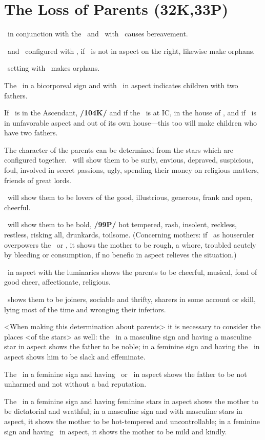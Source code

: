 \section{The Loss of Parents (32K,33P)}

\Mars\, in conjunction with the \Sun\, and \Square\, with \Saturn\, causes bereavement. 

\Saturn\, and \Mars\, configured with \Mercury, if \Jupiter\, is not in aspect on the right, likewise make orphans. 

\Saturn\, setting with \Jupiter\, makes orphans. 

The \Moon\, in a bicorporeal sign and with \Jupiter\, in aspect indicates children with two fathers. 

If \Venus\, is in the Ascendant, \textbf{/104K/} and if the \Moon\, is at IC, in the house of \Mars, and if \Jupiter\, is in unfavorable aspect and out of its own house—this too will make children who have two fathers.

The character of the parents can be determined from the stars which are configured together. \Saturn\, will show them to be surly, envious, depraved, suspicious, foul, involved in secret passions, ugly, spending their money on religious matters, friends of great lords. 

\Jupiter\, will show them to be lovers of the good, illustrious, generous, frank and open, cheerful. 

\Mars\, will show them to be bold, \textbf{/99P/} hot tempered, rash, insolent, reckless, restless, risking all, drunkards, toilsome. (Concerning mothers: if \Mars\,
as houseruler overpowers the \Moon\, or \Venus, it shows the mother to be rough, a whore, troubled acutely by bleeding or consumption, if no benefic in aspect relieves the situation.) 

\Venus\, in aspect with the luminaries shows the parents to be cheerful, musical, fond of good cheer, affectionate, religious. 

\Mercury\, shows them to be joiners, sociable and thrifty, sharers in some account or skill, lying most of the time and
wronging their inferiors.

<When making this determination about parents> it is necessary to consider the places <of the stars>
as well: the \Sun\, in a masculine sign and having a masculine star in aspect shows the father to be noble; in a
feminine sign and having the \Moon\, in aspect shows him to be slack and effeminate. 

The \Sun\, in a feminine sign and having \Saturn\, or \Venus\, in aspect shows the father to be not unharmed and not without a bad reputation. 

The \Moon\, in a feminine sign and having feminine stars in aspect shows the mother to be dictatorial and wrathful; in a masculine sign and with masculine stars in aspect, it shows the mother to be hot-tempered and uncontrollable; in a feminine sign and having \Jupiter\, in aspect, it shows the mother to be mild and kindly.

\newpage